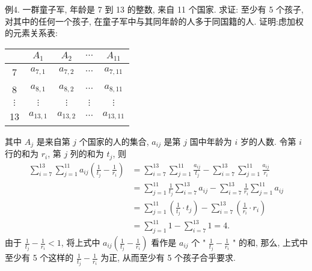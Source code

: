 例4. 一群童子军, 年龄是 7 到 13 的整数, 来自 11 个国家.
求证: 至少有 5 个孩子, 对其中的任何一个孩子, 在童子军中与其同年龄的人多于同国籍的人.
证明:虑加权的元素关系表:
\begin{tabular}{|c|c|c|c|c|}
\hline & $A_1$ & $A_2$ & $\cdots$ & $A_{11}$ \\
\hline 7 & $a_{7,1}$ & $a_{7,2}$ & $\cdots$ & $a_{7,11}$ \\
\hline 8 & $a_{8,1}$ & $a_{8,2}$ & $\cdots$ & $a_{8,11}$ \\
\hline$\vdots$ & $\vdots$ & $\vdots$ & $\vdots$ & $\vdots$ \\
\hline 13 & $a_{13,1}$ & $a_{13,2}$ & $\cdots$ & $a_{13,11}$ \\
\hline
\end{tabular}
其中 $A_j$ 是来自第 $j$ 个国家的人的集合, $a_{i j}$ 是第 $j$ 国中年龄为 $i$ 岁的人数.
令第 $i$ 行的和为 $r_i$, 第 $j$ 列的和为 $t_j$, 则
$$
\begin{aligned}
\sum_{i=7}^{13} \sum_{j=1}^{11} a_{i j}\left(\frac{1}{t_j}-\frac{1}{r_i}\right) & =\sum_{i=7}^{13} \sum_{j=1}^{11} \frac{a_{i j}}{t_j}-\sum_{i=7}^{13} \sum_{j=1}^{11} \frac{a_{i j}}{r_i} \\
& =\sum_{j=1}^{11} \frac{1}{t_j} \sum_{i=7}^{13} a_{i j}-\sum_{i=7}^{13} \frac{1}{r_i} \sum_{j=1}^{11} a_{i j} \\
& =\sum_{j=1}^{11}\left(\frac{1}{t_j} \cdot t_j\right)-\sum_{i=7}^{13}\left(\frac{1}{r_i} \cdot r_i\right) \\
& =\sum_{j=1}^{11} 1-\sum_{i=7}^{13} 1=4 .
\end{aligned}
$$
由于 $\frac{1}{t_j}-\frac{1}{r_i}<1$, 将上式中 $a_{i j}\left(\frac{1}{t_j}-\frac{1}{r_i}\right)$ 看作是 $a_{i j}$ 个 " $\frac{1}{t_j}-\frac{1}{r_i}$ " 的和, 那么, 上式中至少有 5 个这样的 $\frac{1}{t_j}-\frac{1}{r_i}$ 为正, 从而至少有 5 个孩子合乎要求.



